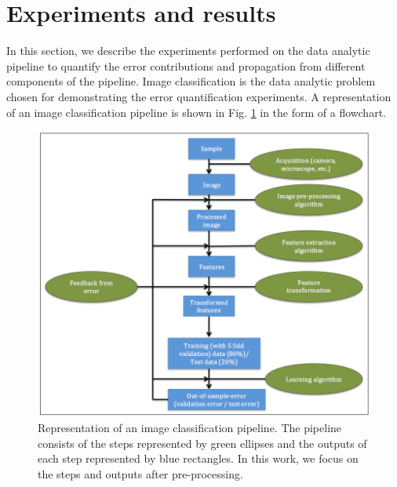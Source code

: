  

\section{Experiments and results}
\label{sec4}
In this section, we describe the experiments performed on the data analytic pipeline to quantify the error contributions and propagation from different components of the pipeline. Image classification is the data analytic problem chosen for demonstrating the error quantification experiments. A representation of an image classification pipeline is shown in Fig. \ref{fig:flowchart} in the form of a flowchart.  
\begin{figure}[ht!]
    \centering
    \includegraphics[scale=0.4]{img/EP/flowchart}
    \caption{Representation of an image classification pipeline. The pipeline consists of the steps represented by green ellipses and the outputs of each step represented by blue rectangles. In this work, we focus on the steps and outputs after pre-processing.}
    \label{fig:flowchart}
\end{figure}
